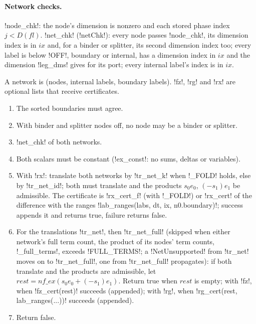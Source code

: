 {{{\paragraph{Network checks.} \lexpy!node_chk!: the node's dimension is nonzero and each stored phase
index $j < D(fl)$. \lexpy!net_chk! (\lexlean!netChk!): every node passes \lexpy!node_chk!, its dimension
index is in $ix$ and, for a binder or splitter, its second dimension index too; every label is
below \lexpy!OFF!, boundary or internal, has a dimension index in $ix$ and the dimension
\lexpy!leg_dms! gives for its port; every internal label's index is in $ix$.

\begin{algorithm}\label{alg:lean-export-sym-check}
A network is (nodes, internal labels, boundary labels). \lexpy!fz!, \lexpy!rg! and \lexpy!rx! are
optional lists that receive certificates.
\begin{enumerate}
\item The sorted boundaries must agree.
\item With binder and splitter nodes off, no node may be a binder or splitter.
\item \lexpy!net_chk! of both networks.
\item Both scalars must be constant (\lexpy!ex_const!: no sums, deltas or variables).
\item With \lexpy!rx!: translate both networks by \lexpy!tr_net_k! when \lexpy!_FOLD! holds, else by
\lexpy!tr_net_id!; both must translate and the products $s_0e_0$, $(-s_1)e_1$ be admissible. The
certificate is \lexpy!rx_cert_f! (with \lexpy!_FOLD!) or \lexpy!rx_cert! of the difference with the
ranges \lexpy!lab_ranges(labs, dt, ix, n0.boundary)!; success appends it and returns true, failure
returns false.
\item For the translations \lexpy!tr_net!, then \lexpy!tr_net_full! (skipped when either network's
full term count, the product of its nodes' term counts, \lexpy!_full_terms!, exceeds
\lexpy!FULL_TERMS!; a \lexpy!NetUnsupported! from \lexpy!tr_net! moves on to \lexpy!tr_net_full!, one from \lexpy!tr_net_full! propagates): if both translate and the products are admissible, let
$\mathit{rest} = \mathit{nf\_ex}(s_0 e_0 + (-s_1) e_1)$. Return true when $\mathit{rest}$ is
empty; with \lexpy!fz!, when \lexpy!fz_cert(rest)! succeeds (appended); with \lexpy!rg!, when
\lexpy!rg_cert(rest, lab_ranges(...))! succeeds (appended).
\item Return false.
\end{enumerate}
\end{algorithm}

}}}
